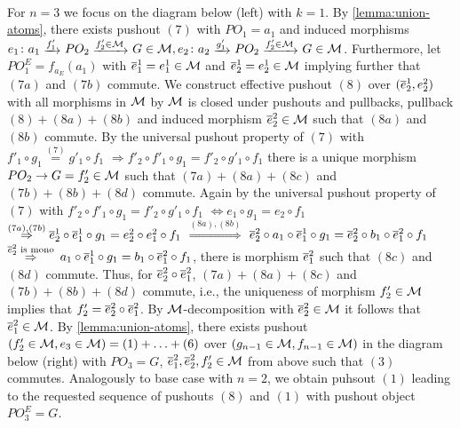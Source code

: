\\ For $n=3$ we focus on the diagram below (left) with $k=1$.
By \cref{lemma:union-atoms}, there exists pushout $(7)$ with $PO_1=a_1$ and induced morphisms $e_1\colon a_1 \trans{f'_1} PO_2 \trans{f'_2 \in \M} G \in \M,e_2\colon a_2 \trans{g'_1} PO_2 \trans{f'_2 \in \M} G \in \M$.
Furthermore, let $PO^E_1=f_{a_E}(a_1)$ with $\overline{e}^1_1=e^1_1 \in {\cal M}$ and $\overline{e}^1_2=e^1_2 \in {\cal M}$ implying further that $(7a)$ and $(7b)$ commute.
We construct effective pushout $(8)$ over $(\overline{e}^1_2,e^2_2)$ with all morphisms in ${\cal M}$ by ${\cal M}$ is closed under pushouts and pullbacks, pullback $(8)+(8a)+(8b)$ and induced morphism $\overline{e}^2_2 \in {\cal M}$ such that $(8a)$ and $(8b)$ commute.
By the universal pushout property of $(7)$ with $f'_1 \circ g_1 \stackrel{(7)}{=} g'_1 \circ f_1$ $\Rightarrow f'_2 \circ f'_1 \circ g_1=f'_2 \circ g'_1 \circ f_1$ there is a unique morphism $PO_2 \to G=f'_2 \in {\cal M}$ such that $(7a)+(8a)+(8c)$ and $(7b)+(8b)+(8d)$ commute.
Again by the universal pushout property of $(7)$ with $f'_2 \circ f'_1 \circ g_1=f'_2 \circ g'_1 \circ f_1$ $\Leftrightarrow e_1 \circ g_1=e_2 \circ f_1$ $\stackrel{(7a),(7b)}{\Rightarrow} \overline{e}^1_2 \circ \overline{e}^1_1 \circ g_1=e^2_2 \circ e^2_1 \circ f_1$ $\stackrel{(8a),(8b)}{\Rightarrow}$ $\overline{e}^{2}_2 \circ a_1 \circ \overline{e}^1_1 \circ g_1=\overline{e}^{2}_2 \circ b_1 \circ \overline{e}^2_1 \circ f_1$ $\stackrel{\overline{e}^2_2\text{ is mono}}{\Rightarrow}$ $a_1 \circ \overline{e}^1_1 \circ g_1=b_1 \circ \overline{e}^2_1 \circ f_1$, there is morphism $\overline{e}^2_1$ such that $(8c)$ and $(8d)$ commute.
Thus, for $\overline{e}^2_2 \circ \overline{e}^2_1$, $(7a)+(8a)+(8c)$ and $(7b)+(8b)+(8d)$ commute, i.e., the uniqueness of morphism $f'_2 \in {\cal M}$ implies that $f'_2=\overline{e}^2_2 \circ \overline{e}^2_1$.
By ${\cal M}$-decomposition with $\overline{e}^2_2 \in {\cal M}$ it follows that $\overline{e}^2_1 \in {\cal M}$.
By \cref{lemma:union-atoms}, there exists pushout $(f'_2 \in {\cal M},e_3 \in {\cal M})=(1)+\ldots+(6)$ over $(g_{n-1} \in {\cal M},f_{n-1} \in {\cal M})$ in the diagram below (right) with $PO_3=G$, $\overline{e}^2_1,\overline{e}^2_2,f'_2 \in {\cal M}$ from above such that $(3)$ commutes.
Analogously to base case with $n=2$, we obtain puhsout $(1)$ leading to the requested sequence of pushouts $(8)$ and $(1)$ with pushout object $PO^E_3=G$.
